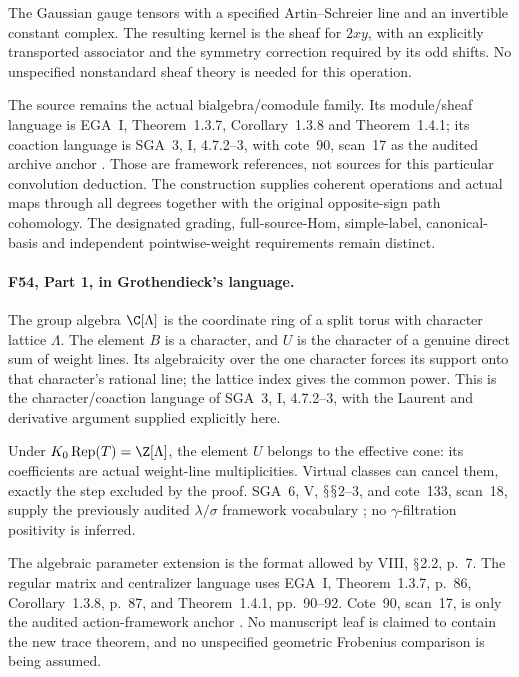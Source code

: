 \documentclass[11pt,a4paper]{article}
\renewcommand{\S}{\ensuremath{\mathsection}}
\newcommand{\fid}[1]{\textsf{#1}}\newcommand{\gate}[1]{\textsf{#1}}
\theoremstyle{named}\newtheorem{finding}{Finding}[section]
\theoremstyle{definition}\newtheorem{definition}[finding]{Definition}
\theoremstyle{remark}\newtheorem{remark}[finding]{Remark}
\begin{document}
The Gaussian gauge tensors with a specified
Artin--Schreier line and an invertible constant
complex. The resulting kernel is the sheaf for
$2xy$, with an explicitly transported associator
and the symmetry correction required by its odd
shifts. No unspecified nonstandard sheaf theory
is needed for this operation.

The source remains the actual bialgebra/comodule
family. Its module/sheaf language is EGA~I,
Theorem~1.3.7, Corollary~1.3.8 and Theorem~1.4.1;
its coaction language is SGA~3, I, 4.7.2--3,
with cote~90, scan~17 as the audited archive anchor
\cite{EGA,SGA3,Archive}.
Those are framework references, not sources for
this particular convolution deduction.
The construction supplies coherent operations and
actual maps through all degrees together with the
original opposite-sign path cohomology.
The designated grading, full-source-Hom, simple-label,
canonical-basis and independent pointwise-weight
requirements remain distinct.

\paragraph{\fid{F54}, Part 1, in Grothendieck's language.}
The group algebra $\C[\Lambda]$ is the coordinate
ring of a split torus with character lattice
$\Lambda$. The element $B$ is a character, and
$U$ is the character of a genuine direct sum of
weight lines. Its algebraicity over the one
character forces its support onto that character's
rational line; the lattice index gives the common
power. This is the character/coaction language of
SGA~3, I, 4.7.2--3, with the Laurent and derivative
argument supplied explicitly here.

Under $K_0\operatorname{Rep}(T)=\Z[\Lambda]$, the
element $U$ belongs to the effective cone: its
coefficients are actual weight-line multiplicities.
Virtual classes can cancel them, exactly the step
excluded by the proof.
SGA~6, V, \S\S2--3, and cote~133, scan~18, supply
the previously audited $\lambda/\sigma$ framework
vocabulary \cite{SGA6,Archive}; no $\gamma$-filtration
positivity is inferred.

The algebraic parameter extension is the format
allowed by VIII, \S2.2, p.~7.
The regular matrix and centralizer language uses
EGA~I, Theorem~1.3.7, p.~86, Corollary~1.3.8,
p.~87, and Theorem~1.4.1, pp.~90--92.
Cote~90, scan~17, is only the audited action-framework
anchor \cite{VIII,EGA,SGA3,Archive}.
No manuscript leaf is claimed to contain the new
trace theorem, and no unspecified geometric
Frobenius comparison is being assumed.
\end{document}
